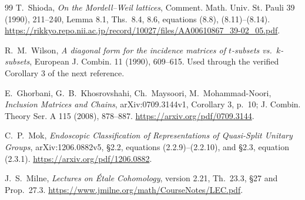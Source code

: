 \documentclass[11pt,a4paper]{article}
\theoremstyle{remark}
\begin{document}
\begin{thebibliography}{99}
T.~Shioda, \emph{On the Mordell--Weil lattices}, Comment. Math. Univ.
St. Pauli 39 (1990), 211--240, Lemma 8.1, Ths.~8.4, 8.6,
equations (8.8), (8.11)--(8.14).
\url{https://rikkyo.repo.nii.ac.jp/record/10027/files/AA00610867_39-02_05.pdf}.

R.~M.~Wilson, \emph{A diagonal form for the incidence matrices of
$t$-subsets vs.\ $k$-subsets}, European J. Combin. 11 (1990),
609--615. Used through the verified Corollary 3 of the next reference.

E.~Ghorbani, G.~B.~Khosrovshahi, Ch.~Maysoori, M.~Mohammad-Noori,
\emph{Inclusion Matrices and Chains}, arXiv:0709.3144v1,
Corollary 3, p.~10; J. Combin. Theory Ser. A 115 (2008), 878--887.
\url{https://arxiv.org/pdf/0709.3144}.

C.~P.~Mok, \emph{Endoscopic Classification of Representations of
Quasi-Split Unitary Groups}, arXiv:1206.0882v5,
\S2.2, equations (2.2.9)--(2.2.10), and \S2.3, equation (2.3.1).
\url{https://arxiv.org/pdf/1206.0882}.

J.~S.~Milne, \emph{Lectures on \'Etale Cohomology}, version 2.21,
Th.~23.3, \S27 and Prop.~27.3.
\url{https://www.jmilne.org/math/CourseNotes/LEC.pdf}.
\end{thebibliography}
\end{document}
